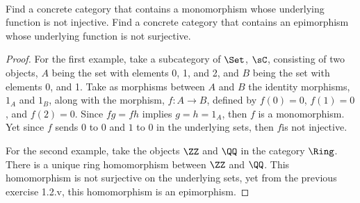 \documentclass[main.tex]{subfiles}
\begin{document}
\paragraph{}
\begin{exercise}
	Find a concrete category that contains a monomorphism whose underlying
	function is not injective. Find a concrete category that contains an
	epimorphism whose underlying function is not surjective.
\end{exercise}

\begin{proof}
	For the first example, take a subcategory of $\Set$, $\sC$, consisting
	of two objects, $A$ being the set with elements 0, 1, and 2, and $B$ being
	the set with elements 0, and 1. Take as morphisms between $A$ and $B$ the
	identity morphisms, $1_A$ and $1_B$, along with the morphism, $f \colon A
	\rightarrow B$, defined by $f(0) = 0$, $f(1) = 0$, and $f(2) = 0$. Since
	$fg= fh$ implies $g=h=1_A$, then $f$ is a monomorphism. Yet since $f$
	sends $0$ to $0$ and $1$ to $0$ in the underlying sets, then $f$is not
	injective.

	For the second example, take the objects $\ZZ$ and $\QQ$ in the
	category $\Ring$. There is a unique ring homomorphism between $\ZZ$ and $\QQ$. This homomorphism is not surjective on the underlying sets,
	yet from the previous exercise 1.2.v, this homomorphism is an epimorphism.
\end{proof}
\end{document}
